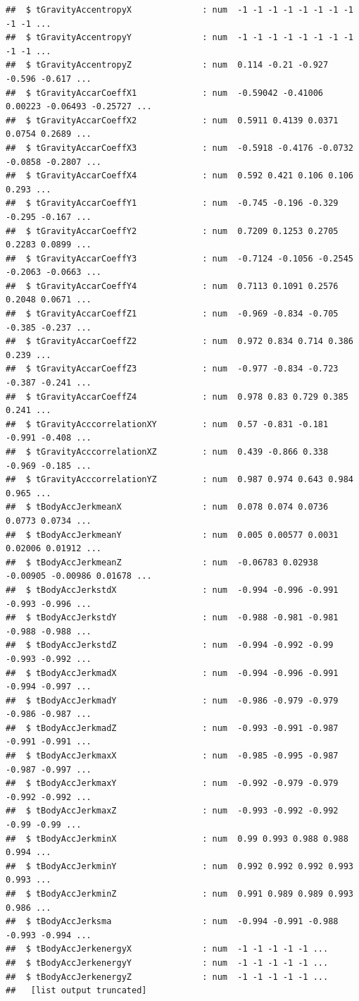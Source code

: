 \documentclass[
]{article}
\begin{document}
\begin{verbatim}
##  $ tGravityAccentropyX              : num  -1 -1 -1 -1 -1 -1 -1 -1 -1 -1 ...
##  $ tGravityAccentropyY              : num  -1 -1 -1 -1 -1 -1 -1 -1 -1 -1 ...
##  $ tGravityAccentropyZ              : num  0.114 -0.21 -0.927 -0.596 -0.617 ...
##  $ tGravityAccarCoeffX1             : num  -0.59042 -0.41006 0.00223 -0.06493 -0.25727 ...
##  $ tGravityAccarCoeffX2             : num  0.5911 0.4139 0.0371 0.0754 0.2689 ...
##  $ tGravityAccarCoeffX3             : num  -0.5918 -0.4176 -0.0732 -0.0858 -0.2807 ...
##  $ tGravityAccarCoeffX4             : num  0.592 0.421 0.106 0.106 0.293 ...
##  $ tGravityAccarCoeffY1             : num  -0.745 -0.196 -0.329 -0.295 -0.167 ...
##  $ tGravityAccarCoeffY2             : num  0.7209 0.1253 0.2705 0.2283 0.0899 ...
##  $ tGravityAccarCoeffY3             : num  -0.7124 -0.1056 -0.2545 -0.2063 -0.0663 ...
##  $ tGravityAccarCoeffY4             : num  0.7113 0.1091 0.2576 0.2048 0.0671 ...
##  $ tGravityAccarCoeffZ1             : num  -0.969 -0.834 -0.705 -0.385 -0.237 ...
##  $ tGravityAccarCoeffZ2             : num  0.972 0.834 0.714 0.386 0.239 ...
##  $ tGravityAccarCoeffZ3             : num  -0.977 -0.834 -0.723 -0.387 -0.241 ...
##  $ tGravityAccarCoeffZ4             : num  0.978 0.83 0.729 0.385 0.241 ...
##  $ tGravityAcccorrelationXY         : num  0.57 -0.831 -0.181 -0.991 -0.408 ...
##  $ tGravityAcccorrelationXZ         : num  0.439 -0.866 0.338 -0.969 -0.185 ...
##  $ tGravityAcccorrelationYZ         : num  0.987 0.974 0.643 0.984 0.965 ...
##  $ tBodyAccJerkmeanX                : num  0.078 0.074 0.0736 0.0773 0.0734 ...
##  $ tBodyAccJerkmeanY                : num  0.005 0.00577 0.0031 0.02006 0.01912 ...
##  $ tBodyAccJerkmeanZ                : num  -0.06783 0.02938 -0.00905 -0.00986 0.01678 ...
##  $ tBodyAccJerkstdX                 : num  -0.994 -0.996 -0.991 -0.993 -0.996 ...
##  $ tBodyAccJerkstdY                 : num  -0.988 -0.981 -0.981 -0.988 -0.988 ...
##  $ tBodyAccJerkstdZ                 : num  -0.994 -0.992 -0.99 -0.993 -0.992 ...
##  $ tBodyAccJerkmadX                 : num  -0.994 -0.996 -0.991 -0.994 -0.997 ...
##  $ tBodyAccJerkmadY                 : num  -0.986 -0.979 -0.979 -0.986 -0.987 ...
##  $ tBodyAccJerkmadZ                 : num  -0.993 -0.991 -0.987 -0.991 -0.991 ...
##  $ tBodyAccJerkmaxX                 : num  -0.985 -0.995 -0.987 -0.987 -0.997 ...
##  $ tBodyAccJerkmaxY                 : num  -0.992 -0.979 -0.979 -0.992 -0.992 ...
##  $ tBodyAccJerkmaxZ                 : num  -0.993 -0.992 -0.992 -0.99 -0.99 ...
##  $ tBodyAccJerkminX                 : num  0.99 0.993 0.988 0.988 0.994 ...
##  $ tBodyAccJerkminY                 : num  0.992 0.992 0.992 0.993 0.993 ...
##  $ tBodyAccJerkminZ                 : num  0.991 0.989 0.989 0.993 0.986 ...
##  $ tBodyAccJerksma                  : num  -0.994 -0.991 -0.988 -0.993 -0.994 ...
##  $ tBodyAccJerkenergyX              : num  -1 -1 -1 -1 -1 ...
##  $ tBodyAccJerkenergyY              : num  -1 -1 -1 -1 -1 ...
##  $ tBodyAccJerkenergyZ              : num  -1 -1 -1 -1 -1 ...
##   [list output truncated]
\end{verbatim}
\end{document}
